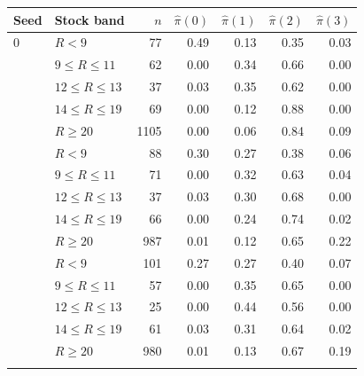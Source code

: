 \begin{tabular}{llrrrrr}
\toprule
Seed & Stock band & $n$ & $\hat\pi(0)$ & $\hat\pi(1)$ & $\hat\pi(2)$ & $\hat\pi(3)$ \\
\midrule
0 & $R<9$ & 77 & 0.49 & 0.13 & 0.35 & 0.03 \\
 & $9\le R\le 11$ & 62 & 0.00 & 0.34 & 0.66 & 0.00 \\
 & $12\le R\le 13$ & 37 & 0.03 & 0.35 & 0.62 & 0.00 \\
 & $14\le R\le 19$ & 69 & 0.00 & 0.12 & 0.88 & 0.00 \\
 & $R\ge 20$ & 1105 & 0.00 & 0.06 & 0.84 & 0.09 \\
\addlinespace
1 & $R<9$ & 88 & 0.30 & 0.27 & 0.38 & 0.06 \\
 & $9\le R\le 11$ & 71 & 0.00 & 0.32 & 0.63 & 0.04 \\
 & $12\le R\le 13$ & 37 & 0.03 & 0.30 & 0.68 & 0.00 \\
 & $14\le R\le 19$ & 66 & 0.00 & 0.24 & 0.74 & 0.02 \\
 & $R\ge 20$ & 987 & 0.01 & 0.12 & 0.65 & 0.22 \\
\addlinespace
2 & $R<9$ & 101 & 0.27 & 0.27 & 0.40 & 0.07 \\
 & $9\le R\le 11$ & 57 & 0.00 & 0.35 & 0.65 & 0.00 \\
 & $12\le R\le 13$ & 25 & 0.00 & 0.44 & 0.56 & 0.00 \\
 & $14\le R\le 19$ & 61 & 0.03 & 0.31 & 0.64 & 0.02 \\
 & $R\ge 20$ & 980 & 0.01 & 0.13 & 0.67 & 0.19 \\
\addlinespace
\bottomrule
\end{tabular}
